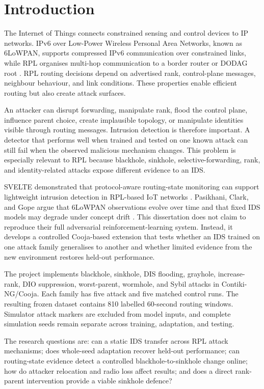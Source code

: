 \chapter{Introduction}
\label{chap:introduction}

The Internet of Things connects constrained sensing and control devices to IP networks. IPv6 over Low-Power Wireless Personal Area Networks, known as 6LoWPAN, supports compressed IPv6 communication over constrained links, while RPL organises multi-hop communication to a border router or DODAG root \cite{rpl6550}. RPL routing decisions depend on advertised rank, control-plane messages, neighbour behaviour, and link conditions. These properties enable efficient routing but also create attack surfaces.

An attacker can disrupt forwarding, manipulate rank, flood the control plane, influence parent choice, create implausible topology, or manipulate identities visible through routing messages. Intrusion detection is therefore important. A detector that performs well when trained and tested on one known attack can still fail when the observed malicious mechanism changes. This problem is especially relevant to RPL because blackhole, sinkhole, selective-forwarding, rank, and identity-related attacks expose different evidence to an IDS.

SVELTE demonstrated that protocol-aware routing-state monitoring can support lightweight intrusion detection in RPL-based IoT networks \cite{svelte2013}. Pasikhani, Clark, and Gope argue that 6LoWPAN observations evolve over time and that fixed IDS models may degrade under concept drift \cite{pasikhani2022arl}. This dissertation does not claim to reproduce their full adversarial reinforcement-learning system. Instead, it develops a controlled Cooja-based extension that tests whether an IDS trained on one attack family generalises to another and whether limited evidence from the new environment restores held-out performance.

The project implements blackhole, sinkhole, DIS flooding, grayhole, increase-rank, DIO suppression, worst-parent, wormhole, and Sybil attacks in Contiki-NG/Cooja. Each family has five attack and five matched control runs. The resulting frozen dataset contains 810 labelled 60-second routing windows. Simulator attack markers are excluded from model inputs, and complete simulation seeds remain separate across training, adaptation, and testing.

The research questions are: can a static IDS transfer across RPL attack mechanisms; does whole-seed adaptation recover held-out performance; can routing-state evidence detect a controlled blackhole-to-sinkhole change online; how do attacker relocation and radio loss affect results; and does a direct rank-parent intervention provide a viable sinkhole defence?

